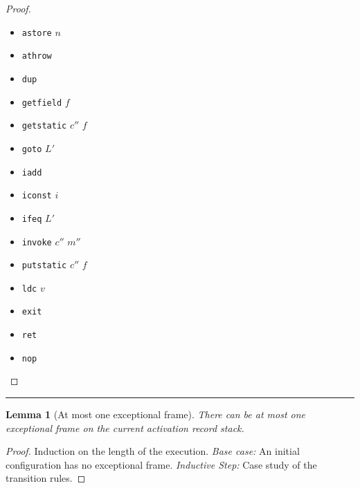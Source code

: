 \documentclass[a4paper,11pt]{article}
\newtheorem{lemma}{Lemma}
\newcommand{\sect}[1]{\noindent\parbox{\textwidth}{#1}}
\newcommand{\sep}{\hspace{-1.5707965cm}\rule{\paperwidth}{1pt}}
\newcommand{\UNSHIFT}{\mathit{unshift}}
\newcommand{\Stack}{\mathrm{s}}
\begin{document}
\begin{proof}
\begin{itemize}
\begin{itemize}
\begin{enumerate}
\begin{itemize}
      \item $c.f$, $l_k$, $e_1 \rightarrow e_2 \mid e_3$, $\bot$: treated similarly as above.
      \end{itemize}
    \item Applying substitution yields $ \| \UNSHIFT(e_1[l_n/\Stack_0] \leq e_2[l_n/\Stack_0]) \| C \Leftrightarrow \| e_1 \leq e_2 \| C'$.
    \item Applying $\UNSHIFT$ yields $ \| \UNSHIFT(e_1[l_n/\Stack_0]) \leq \UNSHIFT(e_2[l_n/\Stack_0]) \| C \Leftrightarrow \| e_1 \leq e_2 \| C'$.
    \item Which equals $ \| \UNSHIFT(e_1[l_n/\Stack_0]) \| C \leq \| \UNSHIFT(e_2[l_n/\Stack_0]) \| C \Leftrightarrow \| e_1 \leq e_2 \| C'$.
    \item By lemma above, this equals $ \| e_1 \| C' \leq \| e_2 \| C' \Leftrightarrow \| e_1 \leq e_2 \| C'$.
    \item Which equals $ \| e_1 \leq e_2 \| C' \Leftrightarrow \| e_1 \leq e_2 \| C'$.
    \end{enumerate}
  \end{itemize}

\item {\tt astore} $n$
\item {\tt athrow}
\item {\tt dup}
\item {\tt getfield} $f$
\item {\tt getstatic} $c''$ $f$
\item {\tt goto} $L'$
\item {\tt iadd}
\item {\tt iconst} $i$
\item {\tt ifeq} $L'$
\item {\tt invoke} $c''$ $m''$
\item {\tt putstatic} $c''$ $f$
\item {\tt ldc} $v$
\item {\tt exit}
\item {\tt ret}
\item {\tt nop}
\end{itemize}
\end{proof}




\sep


\sect{\begin{lemma}[At most one exceptional frame]\label{lem:at_most_one_exc_arec}
There can be at most one exceptional frame on the current activation record stack.
\end{lemma}
\begin{proof} Induction on the length of the execution.
\emph{Base case:} An initial configuration has no exceptional frame. \emph{Inductive Step:} Case study of the transition rules.
\end{proof}}
\end{document}
